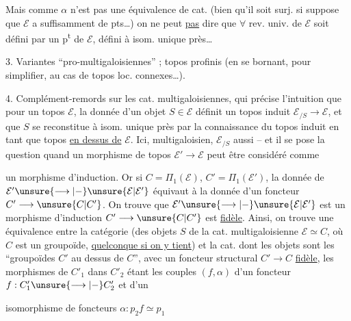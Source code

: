 Mais comme $\alpha$ n'est pas une équivalence de cat. (bien qu'il soit   surj. si  suppose que $\mathcal E$ a suffisamment de pts\dots) on ne peut \uline{pas} dire que $\forall$ rev. univ. de $\mathcal E$ soit défini par un p\textsuperscript{t} de $\mathcal E$, défini à isom. unique près\dots


3. Variantes ``pro-multigaloisiennes'' ; topos profinis (en se bornant, pour simplifier, au cas de topos loc. connexes\dots).

4. Complément-remords sur les cat. multigaloisiennes, qui précise l'intuition que pour un topos $\mathcal E$, la donnée d'un objet $S\in\mathcal E$ définit un topos induit $\mathcal E_{/S}\longrightarrow\mathcal E$, et que $S$ se reconstitue à isom. unique près par la connaissance du topos induit en tant que topos \uline{en dessus de} $\mathcal E$. Ici,   multigaloisien, $\mathcal E_{/S}$ aussi -- et il se pose la question quand un morphisme de topos  $\mathcal E'\longrightarrow\mathcal E$ peut être considéré comme


un morphisme d'induction. Or si $C=\Pi_1(\mathcal E)$, $C'=\Pi_1(\mathcal E')$, la donnée de $\mathcal E'\unsure{\longrightarrow|-}\unsure{\mathcal E|\mathcal E'}$ équivaut à la donnée d'un foncteur $C'\longrightarrow\unsure{C|C'}$. On trouve que $\mathcal E'\unsure{\longrightarrow|-}\unsure{\mathcal E|\mathcal E'}$ est un morphisme d'induction  $C'\longrightarrow\unsure{C|C'}$ est \uline{fidèle}. Ainsi, on trouve une équivalence entre la catégorie  (des objets $S$ de la cat. multigaloisienne $\mathcal E\simeq\widehat C$,  où $C$ est un groupoïde, \uline{quelconque si on y tient})
et la cat. dont les objets sont les ``groupoïdes $C'$ au dessus de $C$'', avec un foncteur structural $C'\longrightarrow C$ \uline{fidèle}, les morphismes de $C'_1$ dans $C'_2$ étant les   couples $(f,\alpha)$ d'un foncteur $f:C'_1\unsure{\longrightarrow|-}C'_2$ et d'un


isomorphisme de foncteurs $\alpha:p_2f\simeq p_1$

